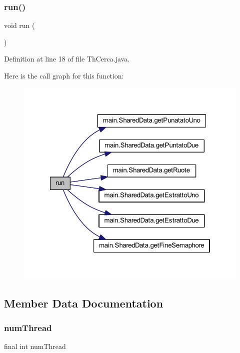 \subsubsection{\texorpdfstring{run()}{run()}}
{\footnotesize\ttfamily void run (\begin{DoxyParamCaption}{ }\end{DoxyParamCaption})}



Definition at line 18 of file Th\+Cerca.\+java.

Here is the call graph for this function\+:
\nopagebreak
\begin{figure}[H]
\begin{center}
\leavevmode
\includegraphics[width=322pt]{classmain_1_1_th_cerca_a13a43e6d814de94978c515cb084873b1_cgraph}
\end{center}
\end{figure}


\subsection{Member Data Documentation}
\mbox{\label{classmain_1_1_th_cerca_a647182b81f9dc0ef69645f81af0b6a73}} 
\subsubsection{\texorpdfstring{num\+Thread}{numThread}}
{\footnotesize\ttfamily final int num\+Thread\hspace{0.3cm}{\ttfamily [private]}}



